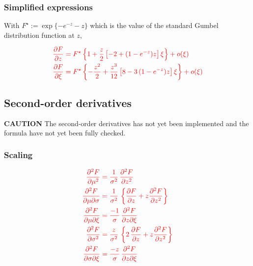\subsubsection*{Simplified expressions}
With {\color{red}$F^\star := \exp\{-e^{-z} - z\}$} which is the value
of the standard Gumbel distribution function at $z$,

\begin{equation}
  \color{red}
  \label{eq:SimpDer1F}
  \begin{aligned}
    \frac{\partial F}{\partial z}
    &= F^\star \left\{ 1 + \frac{z}{2} \left[ -2 + (1 -e^{-z}) z \right] \xi \right\}
      + o(\xi) \\
  \frac{\partial F}{\partial \xi}
  &= F^\star
    \left\{-\frac{z^2}{2}
    + \frac{z^3}{12} \left[8 - 3 \, (1 -e^{-z}) z \right] \xi \right\}
    + o(\xi)
  \end{aligned}
\end{equation}

\subsection{Second-order derivatives}

\textbf{CAUTION} The second-order derivatives has not yet been implemented and
the formula have not yet been fully checked.

\subsubsection*{Scaling}

\begin{equation}
  \label{eq:ScalDer2F}
  \color{red}
  \begin{aligned}
    \frac{\partial^2 F}{\partial \mu^2}
    &= \frac{1}{\sigma^2} \,
      \frac{\partial^2 F}{\partial z^2} \\
    \frac{\partial^2 F}{\partial \mu \partial \sigma}
    &= \frac{1}{\sigma^2} \,
      \left\{
      \frac{\partial F}{\partial z} +
      z \frac{\partial^2 F}{\partial z^2}
      \right\} \\
    \frac{\partial^2 F}{\partial \mu \partial \xi}
    &= \frac{-1}{\sigma} \,
      \frac{\partial^2 F}{\partial z \partial \xi}\\
    \frac{\partial^2 F}{\partial \sigma^2}
    &= \frac{z}{\sigma^2} \,
      \left\{2 \, \frac{\partial F}{\partial z} + z
      \frac{\partial^2 F}{\partial z^2} \right\} \\
    \frac{\partial^2 F}{\partial \sigma \partial \xi}
    &= \frac{-z}{\sigma} \,
      \frac{\partial^2 F}{\partial z \partial \xi} 
  \end{aligned}
\end{equation}

